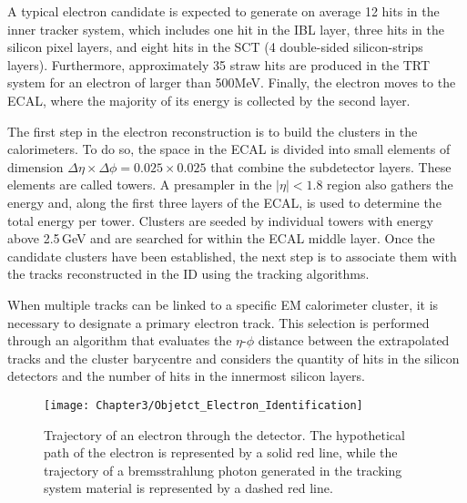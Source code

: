 A typical electron candidate is expected to generate on average 12 hits in the inner tracker system, 
which includes one hit in the IBL layer, three hits in the silicon pixel layers, and 
eight hits in the SCT (4 double-sided silicon-strips layers).
Furthermore, approximately 35 straw hits are produced in the TRT system for an electron
of \pT larger than 500\;MeV. Finally, the electron moves to the ECAL, where the majority
of its energy is collected by the second layer.

The first step in the electron reconstruction is to build the clusters in the calorimeters.
To do so, the space in the ECAL is divided into small elements of dimension 
$\Delta \eta \times \Delta \phi =  0.025 \times 0.025$ that combine the subdetector layers. 
These elements are called towers. A presampler in the $|\eta|<1.8$ region also gathers the energy
and, along the first three layers of the ECAL, is used to determine the total energy per tower.
Clusters are seeded by individual towers with energy above 2.5$\,$GeV and are
searched for within the ECAL middle layer. Once the candidate clusters have been established,
the next step is to associate them with the tracks reconstructed in the ID using the tracking algorithms.

When multiple tracks can be linked to a specific EM calorimeter cluster, 
it is necessary to designate a primary electron track. This selection is performed 
through an algorithm that evaluates the $\eta$-$\phi$ distance between the extrapolated 
tracks and the cluster barycentre and considers the quantity of hits in the silicon 
detectors and the number of hits in the innermost silicon layers.
	
\begin{figure}
	\centering
 	\texttt{[image: Chapter3/Objetct\_Electron\_Identification]}
  	\caption{Trajectory of an electron through the detector. 
	The hypothetical path of the electron is represented by a solid red line, while the trajectory of a
	bremsstrahlung photon generated in the tracking system material is represented by a dashed red line.}
	 \label{fig:ChapReco:ElectronPath}
\end{figure}

